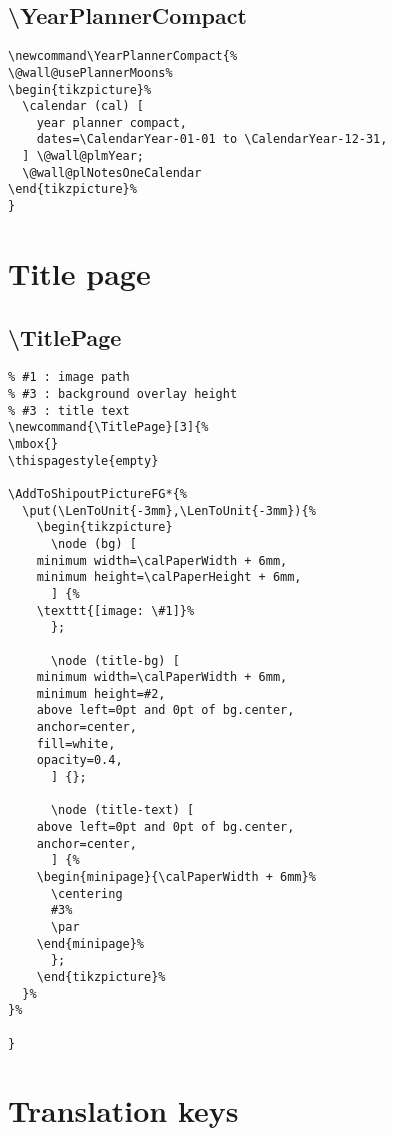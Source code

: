 \documentclass[11pt,oneside]{memoir-article}
\begin{document}
\section{\textbackslash YearPlannerCompact}
\label{sec:org50b9fdc}

\begin{verbatim}
\newcommand\YearPlannerCompact{%
\@wall@usePlannerMoons%
\begin{tikzpicture}%
  \calendar (cal) [
    year planner compact,
    dates=\CalendarYear-01-01 to \CalendarYear-12-31,
  ] \@wall@plmYear;
  \@wall@plNotesOneCalendar
\end{tikzpicture}%
}
\end{verbatim}

\chapter{Title page}
\label{sec:org5dfd4f6}

\section{\textbackslash TitlePage}
\label{sec:orgfef7ef5}

\begin{verbatim}
% #1 : image path
% #3 : background overlay height
% #3 : title text
\newcommand{\TitlePage}[3]{%
\mbox{}
\thispagestyle{empty}

\AddToShipoutPictureFG*{%
  \put(\LenToUnit{-3mm},\LenToUnit{-3mm}){%
    \begin{tikzpicture}
      \node (bg) [
	minimum width=\calPaperWidth + 6mm,
	minimum height=\calPaperHeight + 6mm,
      ] {%
	\texttt{[image: \#1]}%
      };

      \node (title-bg) [
	minimum width=\calPaperWidth + 6mm,
	minimum height=#2,
	above left=0pt and 0pt of bg.center,
	anchor=center,
	fill=white,
	opacity=0.4,
      ] {};

      \node (title-text) [
	above left=0pt and 0pt of bg.center,
	anchor=center,
      ] {%
	\begin{minipage}{\calPaperWidth + 6mm}%
	  \centering
	  #3%
	  \par
	\end{minipage}%
      };
    \end{tikzpicture}%
  }%
}%

}
\end{verbatim}

\chapter{Translation keys}
\label{sec:orgde00deb}
\end{document}
